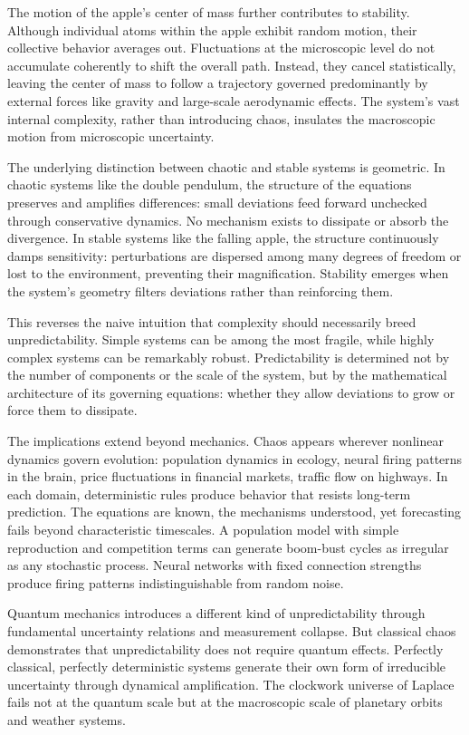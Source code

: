 The motion of the apple’s center of mass further contributes to stability. Although individual atoms within the apple exhibit random motion, their collective behavior averages out. Fluctuations at the microscopic level do not accumulate coherently to shift the overall path. Instead, they cancel statistically, leaving the center of mass to follow a trajectory governed predominantly by external forces like gravity and large-scale aerodynamic effects. The system's vast internal complexity, rather than introducing chaos, insulates the macroscopic motion from microscopic uncertainty.

The underlying distinction between chaotic and stable systems is geometric. In chaotic systems like the double pendulum, the structure of the equations preserves and amplifies differences: small deviations feed forward unchecked through conservative dynamics. No mechanism exists to dissipate or absorb the divergence. In stable systems like the falling apple, the structure continuously damps sensitivity: perturbations are dispersed among many degrees of freedom or lost to the environment, preventing their magnification. Stability emerges when the system’s geometry filters deviations rather than reinforcing them.

This reverses the naive intuition that complexity should necessarily breed unpredictability. Simple systems can be among the most fragile, while highly complex systems can be remarkably robust. Predictability is determined not by the number of components or the scale of the system, but by the mathematical architecture of its governing equations: whether they allow deviations to grow or force them to dissipate.

The implications extend beyond mechanics. Chaos appears wherever nonlinear dynamics govern evolution: population dynamics in ecology, neural firing patterns in the brain, price fluctuations in financial markets, traffic flow on highways. In each domain, deterministic rules produce behavior that resists long-term prediction. The equations are known, the mechanisms understood, yet forecasting fails beyond characteristic timescales. A population model with simple reproduction and competition terms can generate boom-bust cycles as irregular as any stochastic process. Neural networks with fixed connection strengths produce firing patterns indistinguishable from random noise.

Quantum mechanics introduces a different kind of unpredictability through fundamental uncertainty relations and measurement collapse. But classical chaos demonstrates that unpredictability does not require quantum effects. Perfectly classical, perfectly deterministic systems generate their own form of irreducible uncertainty through dynamical amplification. The clockwork universe of Laplace fails not at the quantum scale but at the macroscopic scale of planetary orbits and weather systems.

